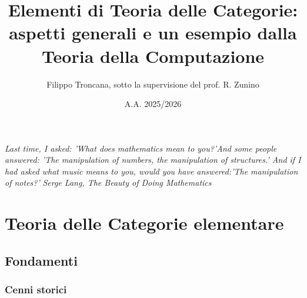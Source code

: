 \documentclass[openany]{book}
\title{Elementi di Teoria delle Categorie: aspetti generali e un esempio dalla Teoria della Computazione}
\author{Filippo Troncana, sotto la supervisione del prof. R. Zunino}
\date{A.A. 2025/2026}
\begin{document}

\begin{titlepage}
    
\end{titlepage}

%

\vspace*{200pt}

\begin{flushright}
    \textit{Last time, I asked: 'What does mathematics mean to you?'\linebreak And some people answered: 'The manipulation of numbers, the manipulation of structures.'\linebreak 
    And if I had asked what music means to you, would you have answered:\linebreak 'The manipulation of notes?'}\linebreak
    \linebreak
    \textit{Serge Lang, The Beauty of Doing Mathematics}
\end{flushright}

\tableofcontents

\chapter{Teoria delle Categorie elementare}

\section{Fondamenti}

\subsection{Cenni storici}
\end{document}
